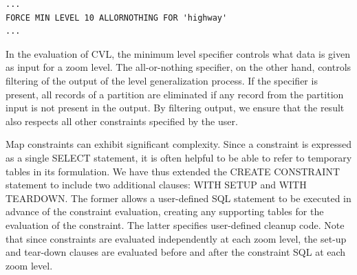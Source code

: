 \begin{lstlisting}
...
FORCE MIN LEVEL 10 ALLORNOTHING FOR 'highway'
... 
\end{lstlisting}

In the evaluation of CVL, the minimum level specifier controls what data is given as input for a zoom level. The all-or-nothing specifier, on the other hand, controls filtering of the output of the level generalization process. If the specifier is present, all records of a partition are eliminated if any record from the partition input is not present in the output. By filtering output, we ensure that the result also respects all other constraints specified by the user. 

Map constraints can exhibit significant complexity. Since a constraint is expressed as a single SELECT statement, it is often helpful to be able to refer to temporary tables in its formulation. We have thus extended the CREATE CONSTRAINT statement to include two additional clauses: WITH SETUP and WITH TEARDOWN. The former allows a user-defined SQL statement to be executed in advance of the constraint evaluation, creating any supporting tables for the evaluation of the constraint. The latter specifies user-defined cleanup code. Note that since constraints are evaluated independently at each zoom level, the set-up and tear-down clauses are evaluated before and after the constraint SQL at each zoom level.       

%
%

